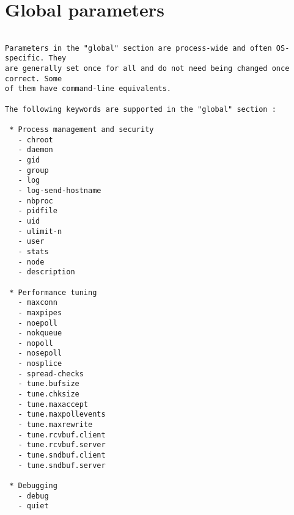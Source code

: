 
\chapter{Global parameters}

\begin{verbatim}

Parameters in the "global" section are process-wide and often OS-specific. They
are generally set once for all and do not need being changed once correct. Some
of them have command-line equivalents.

The following keywords are supported in the "global" section :

 * Process management and security
   - chroot
   - daemon
   - gid
   - group
   - log
   - log-send-hostname
   - nbproc
   - pidfile
   - uid
   - ulimit-n
   - user
   - stats
   - node
   - description

 * Performance tuning
   - maxconn
   - maxpipes
   - noepoll
   - nokqueue
   - nopoll
   - nosepoll
   - nosplice
   - spread-checks
   - tune.bufsize
   - tune.chksize
   - tune.maxaccept
   - tune.maxpollevents
   - tune.maxrewrite
   - tune.rcvbuf.client
   - tune.rcvbuf.server
   - tune.sndbuf.client
   - tune.sndbuf.server

 * Debugging
   - debug
   - quiet


\end{verbatim}

